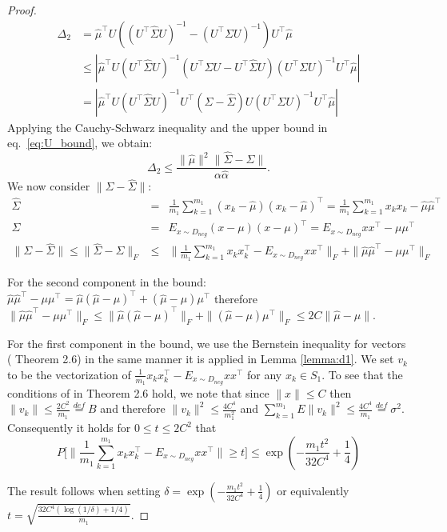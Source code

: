 \documentclass[twoside,11pt]{article}
\begin{document}
\begin{proof}

\begin{align}
\Delta_2&=\hat{\mu}^\top U\left((U^\top\hat{\Sigma}U)^{-1} - (U^\top\Sigma U)^{-1} \right)U^\top\hat{\mu}\\ \nonumber&\leq \left|\hat{\mu}^\top U (U^\top\hat{\Sigma}U)^{-1} (U^\top \Sigma U -U^\top\hat{\Sigma}U)(U^\top\Sigma U)^{-1}U^\top\hat{\mu}\right|\\ \nonumber& = \left|\hat{\mu}^\top U(U^\top\hat{\Sigma}U)^{-1} U^\top (\Sigma-\hat{\Sigma}) U (U^\top \Sigma U)^{-1}U^\top\hat{\mu}\right|
\end{align}
Applying the Cauchy-Schwarz inequality and the upper bound in eq.~\ref{eq:U_bound}, we obtain:
$$\Delta_2 \le \frac{\|\hat{\mu}\|^2\|\hat{\Sigma}-\Sigma\|}{\alpha\hat{\alpha}}.$$
We now consider $\|\Sigma - \hat \Sigma\|$: %
\begin{eqnarray}
\hat \Sigma &=& \frac{1}{m_1} \sum_{k=1}^{m_1} (x_k - \hat \mu) (x_k - \hat \mu)^\top =  \frac{1}{m_1} \sum_{k=1}^{m_1}  x_k x_k - \hat \mu \hat \mu^\top \nonumber \\
\Sigma &=& E_{x \sim D_{neg}} (x - \mu) (x - \mu)^\top = E_{x \sim D_{neg}} x x^\top  - \mu \mu^\top  \nonumber  \\
\|\Sigma - \hat \Sigma\|\leq \|\hat \Sigma - \Sigma\|_F &\le& \| \frac{1}{m_1} \sum_{k=1}^{m_1}  x_k x_k^\top - E_{x \sim D_{neg}} x x^\top \|_F + \| \hat \mu \hat \mu^\top - \mu \mu^\top \|_F \nonumber
\end{eqnarray}

For the second component in the bound: $\hat \mu \hat \mu^\top - \mu \mu^\top = \hat \mu (\hat \mu - \mu)^\top + (\hat \mu - \mu)\mu^\top$ therefore $\| \hat \mu \hat \mu^\top - \mu \mu^\top  \|_F \le \| \hat \mu (\hat \mu - \mu)^\top\|_F + \|(\hat \mu - \mu)\mu^\top \|_F \le 2C \|\hat \mu - \mu \| $.

For the first component in the bound, we use the Bernstein inequality for vectors (\cite{Candes11} Theorem 2.6) in the same manner it is applied in Lemma \ref{lemma:d1}. We set $v_k$ to be the vectorization of $\frac{1}{m_1} x_k x_k^\top  - E_{x \sim D_{neg}} x x^\top$ for any $x_k \in S_1$.  To see that the conditions of \cite{Candes11} in Theorem 2.6 hold, we note that since $\|x\| \le C$ then $\|v_k\| \le \frac{2C^2}{m_1} \stackrel{def}{=} B$ and therefore $\|v_k\|^2 \le \frac{4C^4}{m_1^2}$ and  $\sum_{k=1}^{m_1} E \|v_k\|^2 \le \frac{4C^4}{m_1} \stackrel{def}{=} \sigma^2$. Consequently it holds for $0 \le t \le 2C^2$ that
\[
P \Big[\Big\| \frac{1}{m_1} \sum_{k=1}^{m_1}  x_k x_k^\top - E_{x \sim D_{neg}} x x^\top \Big\| \ge t \Big] \le \exp(-\frac{m_1t^2}{32 C^4} + \frac{1}{4})
\]

The result follows when setting $\delta = \exp(-\frac{m_1t^2}{32 C^4} + \frac{1}{4})$ or equivalently $t= \sqrt{\frac{32C^4(\log(1/\delta) + 1/4)}{m_1}}$.
\end{proof}
\end{document}
